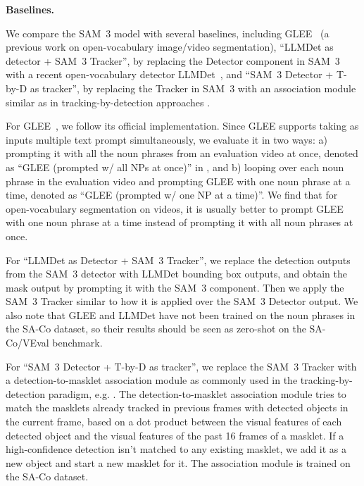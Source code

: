 \documentclass[]{fairmeta}
\newcommand{\model}{SAM~3\xspace}
\newcommand{\dsname}{{SA-Co}\xspace}
\newcommand{\evalvid}{{\dsname/VEval}\xspace}
\renewcommand{\paragraph}[1]{%
	\noindent\textbf{#1.}\noindent\xspace%
}
\begin{document}
		\paragraph{Baselines}
		We compare the \model model with several baselines, including GLEE~\citep{glee} (a previous work on open-vocabulary image/video segmentation), ``LLMDet as detector + \model Tracker'', by replacing the Detector component in \model with a recent open-vocabulary detector LLMDet~\citep{fu2025llmdet}, and ``\model Detector + T-by-D as tracker'', by replacing the Tracker in \model with an association module similar as in tracking-by-detection approaches \citep{wojke2017simple,zhang2022bytetrack}.
		
		For GLEE~\citep{glee}, we follow its official implementation. Since GLEE supports taking as inputs multiple text prompt simultaneously, we evaluate it in two ways: a) prompting it with all the noun phrases from an evaluation video at once, denoted as ``GLEE (prompted w/ all NPs at once)'' in , and b) looping over each noun phrase in the evaluation video and prompting GLEE with one noun phrase at a time, denoted as ``GLEE (prompted w/ one NP at a time)''. We find that for open-vocabulary segmentation on videos, it is usually better to prompt GLEE with one noun phrase at a time instead of prompting it with all noun phrases at once.
		
		For ``LLMDet as Detector + \model Tracker'', we replace the detection outputs from the \model detector with LLMDet \citep{fu2025llmdet} bounding box outputs, and obtain the mask output by prompting it with the \model component. Then we apply the \model Tracker similar to how it is applied over the \model Detector output. We also note that GLEE and LLMDet have not been trained on the noun phrases in the \dsname dataset, so their results should be seen as zero-shot on the \evalvid benchmark.
		
		For ``\model Detector + T-by-D as tracker'', we replace the \model Tracker with a detection-to-masklet association module as commonly used in the tracking-by-detection paradigm, e.g. \cite{wojke2017simple,zhang2022bytetrack}. The detection-to-masklet association module tries to match the masklets already tracked in previous frames with detected objects in the current frame, based on a dot product between the visual features of each detected object and the visual features of the past 16 frames of a masklet. If a high-confidence detection isn't matched to any existing masklet, we add it as a new object and start a new masklet for it. The association module is trained on the \dsname dataset.
		
\end{document}
